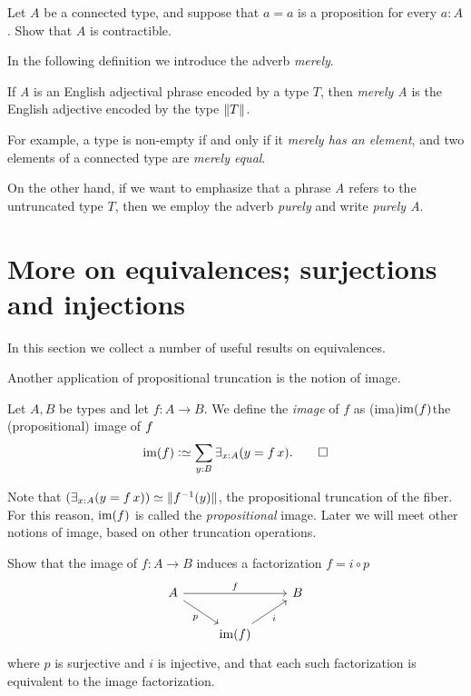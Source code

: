 \begin{xca}\label{xca:connected-trivia}
Let $A$ be a connected type, and suppose that $a=a$ is a proposition for every $a:A$.
Show that $A$ is contractible.
\end{xca}

In the following definition we introduce the adverb \emph{merely}.

\begin{definition}\label{def:merely}
  If \emph{A} is an English adjectival phrase encoded by a type $T$,
  then \emph{merely A} is the English adjective encoded by the type $\lVert T\rVert$.
\end{definition}

For example, a type is non-empty if and only if it \emph{merely has an element}, and two elements of a connected type are \emph{merely equal}.

On the other hand, if we want to emphasize that a phrase \emph{A} refers to the
untruncated type $T$, then we employ the adverb \emph{purely}
and write \emph{purely A}.


\section{More on equivalences; surjections and injections}
\label{sec:more-on-equivalences}

In this section we collect a number of useful results on equivalences.

Another application of propositional truncation
is the notion of image.
\begin{definition}\label{def:prop-image}
  Let $A,B$ be types and let $f : A \to B$. We define the \emph{image} of $f$ as
  \glossary(ima){$\protect\im(f)$}{the (propositional) image of $\protect f$}
  \[
    \im(f) \defeq \sum_{y:B}\exists_{x:A}(y = f\,x).\qedhere
  \]
\end{definition}

Note that $(\exists_{x:A}(y = f\,x)) \jdeq \Trunc{f^{-1}(y)}$,
the propositional truncation of the fiber.
For this reason, $\im(f)$ is called the \emph{propositional} image.
Later we will meet other notions of image, based on other truncation operations.

\begin{xca}\label{xca:unique-fact-image}
  Show that the image of $f : A \to B$ induces a factorization $f = i\circ p$
  \[
    \begin{tikzcd}
      A \ar[rr,"f"]\ar[dr,"p"'] & & B \\
      & \im(f)\ar[ur,"i"'] &
    \end{tikzcd}
  \]
  where $p$ is surjective and $i$ is injective, and that each such factorization
  is equivalent to the image factorization.
\end{xca}

